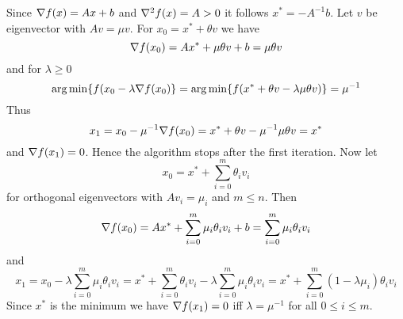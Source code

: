 \proof{}
Since \( \nabla {f(x)} = Ax + b \) and \( \nabla^2 {f(x)} = A > 0 \) it follows \( x^* = -A^{-1}b \).
Let \( v \) be eigenvector with \( Av = \mu v \). For \( x_0 = x^* + \theta v \) we have
\[ 
    \nabla {f(x_0)} = Ax^* + \mu \theta v + b = \mu \theta v 
\] 
and for \(\lambda \ge 0 \)
\[
        \operatorname*{arg\,min} \{ f(x_0 - \lambda \nabla f(x_0) \} =\operatorname*{arg\,min} \{ f(x^* + \theta v - \lambda \mu \theta v)\} = \mu^{-1} 
\]
Thus         
\[
    x_1 = x_0 - \mu^{-1} \nabla f(x_0) = x^* + \theta v - \mu^{-1} \mu \theta v = x^*
\]
and \( \nabla {f(x_1)} = 0 \). Hence the algorithm stops after the first iteration.
Now let 
\[
    x_0 = x^* + \sum_{i=0}^m \theta_i v_i
\]
for orthogonal eigenvectors with \( Av_i = \mu_i\) and \( m \le n \). Then
\[ 
    \nabla {f(x_0)} = Ax^* + \sum_{i=0}^m \mu_i \theta_i v_i + b = \sum_{i=0}^m \mu_i \theta_i v_i
\]
and
\[ 
    x_1 = x_0 - \lambda \sum_{i=0}^m \mu_i \theta_i v_i 
        = x^* + \sum_{i=0}^m \theta_i v_i - \lambda \sum_{i=0}^m \mu_i \theta_i v_i
        = x^* + \sum_{i=0}^m (1 - \lambda \mu_i) \theta_i v_i
\]
Since \( x^* \) is the minimum we have \( \nabla {f(x_1)} = 0 \) iff \( \lambda = \mu^{-1} \) for all \( 0 \le i \le m \).
\bigskip
